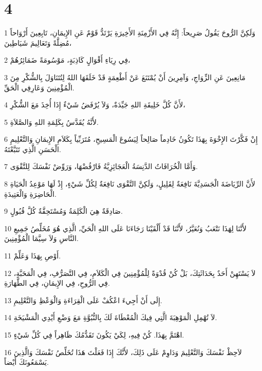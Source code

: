 \chapter{4}

\par 1 وَلَكِنَّ الرُّوحَ يَقُولُ صَرِيحاً: إِنَّهُ فِي الأَزْمِنَةِ الأَخِيرَةِ يَرْتَدُّ قَوْمٌ عَنِ الإِيمَانِ، تَابِعِينَ أَرْوَاحاً مُضِلَّةً وَتَعَالِيمَ شَيَاطِينَ،
\par 2 فِي رِيَاءِ أَقْوَالٍ كَاذِبَةٍ، مَوْسُومَةً ضَمَائِرُهُمْ،
\par 3 مَانِعِينَ عَنِ الزِّوَاجِ، وَآمِرِينَ أَنْ يُمْتَنَعَ عَنْ أَطْعِمَةٍ قَدْ خَلَقَهَا اللهُ لِتُتَنَاوَلَ بِالشُّكْرِ مِنَ الْمُؤْمِنِينَ وَعَارِفِي الْحَقِّ.
\par 4 لأَنَّ كُلَّ خَلِيقَةِ اللهِ جَيِّدَةٌ، وَلاَ يُرْفَضُ شَيْءٌ إِذَا أُخِذَ مَعَ الشُّكْرِ،
\par 5 لأَنَّهُ يُقَدَّسُ بِكَلِمَةِ اللهِ وَالصَّلاَةِ.
\par 6 إِنْ فَكَّرْتَ الإِخْوَةَ بِهَذَا تَكُونُ خَادِماً صَالِحاً لِيَسُوعَ الْمَسِيحِ، مُتَرَبِّياً بِكَلاَمِ الإِيمَانِ وَالتَّعْلِيمِ الْحَسَنِ الَّذِي تَتَبَّعْتَهُ.
\par 7 وَأَمَّا الْخُرَافَاتُ الدَّنِسَةُ الْعَجَائِزِيَّةُ فَارْفُضْهَا، وَرَوِّضْ نَفْسَكَ لِلتَّقْوَى.
\par 8 لأَنَّ الرِّيَاضَةَ الْجَسَدِيَّةَ نَافِعَةٌ لِقَلِيلٍ، وَلَكِنَّ التَّقْوَى نَافِعَةٌ لِكُلِّ شَيْءٍ، إِذْ لَهَا مَوْعِدُ الْحَيَاةِ الْحَاضِرَةِ وَالْعَتِيدَةِ.
\par 9 صَادِقَةٌ هِيَ الْكَلِمَةُ وَمُسْتَحِقَّةٌ كُلَّ قُبُولٍ.
\par 10 لأَنَّنَا لِهَذَا نَتْعَبُ وَنُعَيَّرُ، لأَنَّنَا قَدْ أَلْقَيْنَا رَجَاءَنَا عَلَى اللهِ الْحَيِّ، الَّذِي هُوَ مُخَلِّصُ جَمِيعِ النَّاسِ وَلاَ سِيَّمَا الْمُؤْمِنِينَ.
\par 11 أَوْصِ بِهَذَا وَعَلِّمْ.
\par 12 لاَ يَسْتَهِنْ أَحَدٌ بِحَدَاثَتِكَ، بَلْ كُنْ قُدْوَةً لِلْمُؤْمِنِينَ فِي الْكَلاَمِ، فِي التَّصَرُّفِ، فِي الْمَحَبَّةِ، فِي الرُّوحِ، فِي الإِيمَانِ، فِي الطَّهَارَةِ.
\par 13 إِلَى أَنْ أَجِيءَ اعْكُفْ عَلَى الْقِرَاءَةِ وَالْوَعْظِ وَالتَّعْلِيمِ.
\par 14 لاَ تُهْمِلِ الْمَوْهِبَةَ الَّتِي فِيكَ الْمُعْطَاةَ لَكَ بِالنُّبُوَّةِ مَعَ وَضْعِ أَيْدِي الْمَشْيَخَةِ.
\par 15 اهْتَمَّ بِهَذَا. كُنْ فِيهِ، لِكَيْ يَكُونَ تَقَدُّمُكَ ظَاهِراً فِي كُلِّ شَيْءٍ.
\par 16 لاَحِظْ نَفْسَكَ وَالتَّعْلِيمَ وَدَاوِمْ عَلَى ذَلِكَ، لأَنَّكَ إِذَا فَعَلْتَ هَذَا تُخَلِّصُ نَفْسَكَ وَالَّذِينَ يَسْمَعُونَكَ أَيْضاً.

